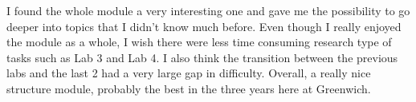 I found the whole module a very interesting one and gave me the possibility to
go deeper into topics that I didn't know much before. Even though I really
enjoyed the module as a whole, I wish there were less time consuming research
type of tasks such as Lab 3 and Lab 4. I also think the transition between the
previous labs and the last 2 had a very large gap in difficulty. Overall, a
really nice structure module, probably the best in the three years here at
Greenwich.
